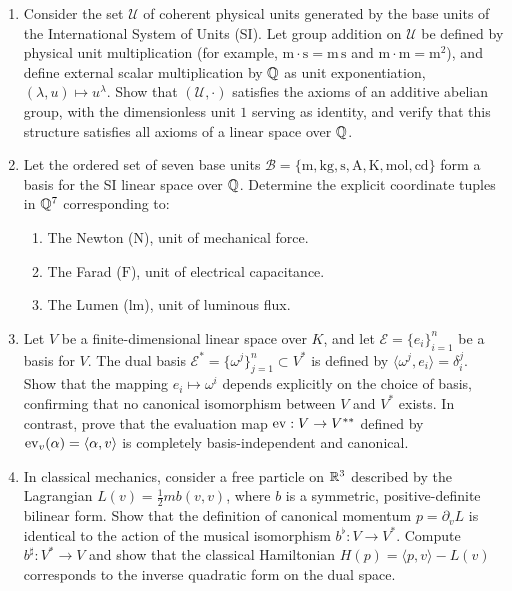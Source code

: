 \documentclass[11pt,a4paper]{article}
\begin{document}
\begin{enumerate}
  \item Consider the set $\mathcal{U}$ of coherent physical units generated by
    the base units of the International System of Units (SI).
    Let group addition on $\mathcal{U}$ be defined by physical unit
    multiplication (for example, $\mathrm{m} \cdot \mathrm{s} = \mathrm{m\,s}$
    and $\mathrm{m} \cdot \mathrm{m} = \mathrm{m}^2$), and define external
    scalar multiplication by $\mathbb{Q}$ as unit exponentiation,
    $(\lambda, u) \mapsto u^\lambda$.
    Show that $(\mathcal{U}, \cdot)$ satisfies the axioms of an additive
    abelian group, with the dimensionless unit $1$ serving as identity, and
    verify that this structure satisfies all axioms of a linear space over $\mathbb{Q}$.

  \item Let the ordered set of seven base units $\mathcal{B} = \{\mathrm{m},
      \mathrm{kg}, \mathrm{s}, \mathrm{A}, \mathrm{K}, \mathrm{mol},
    \mathrm{cd}\}$ form a basis for the SI linear space over $\mathbb{Q}$.
    Determine the explicit coordinate tuples in $\mathbb{Q}^7$ corresponding to:
    \begin{enumerate}
      \item The Newton ($\mathrm{N}$), unit of mechanical force.
      \item The Farad ($\mathrm{F}$), unit of electrical capacitance.
      \item The Lumen ($\mathrm{lm}$), unit of luminous flux.
    \end{enumerate}

  \item Let $V$ be a finite-dimensional linear space over $K$, and let
    $\mathcal{E} = \{e_i\}_{i=1}^n$ be a basis for $V$.
    The dual basis $\mathcal{E}^* = \{\omega^j\}_{j=1}^n \subset V^*$ is
    defined by $\langle \omega^j, e_i \rangle = \delta^j_i$.
    Show that the mapping $e_i \mapsto \omega^i$ depends explicitly on the
    choice of basis, confirming that no canonical isomorphism between $V$ and
    $V^*$ exists.
    In contrast, prove that the evaluation map $\operatorname{ev} : V \to V^{**}$ defined by
    $\operatorname{ev}_v(\alpha) = \langle \alpha, v \rangle$ is completely basis-independent
    and canonical.

  \item In classical mechanics, consider a free particle on $\mathbb{R}^3$ described by
    the Lagrangian $L(v) = \frac{1}{2} m b(v, v)$, where $b$ is a symmetric,
    positive-definite bilinear form.
    Show that the definition of canonical momentum $p = \partial_v L$ is
    identical to the action of the musical isomorphism $b^\flat : V \to V^*$.
    Compute $b^\sharp : V^* \to V$ and show that the classical Hamiltonian
    $H(p) = \langle p, v \rangle - L(v)$ corresponds to the inverse quadratic
    form on the dual space.


\end{enumerate}
\end{document}
